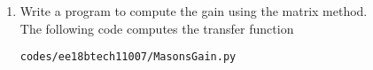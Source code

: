 \begin{enumerate}[label=\thesubsection.\arabic*.,ref=\thesubsection.\theenumi]
\begin{align}
{{\\0&0&-1&1
\\0&0&0&-1/s}}
{
\myvec{1 & 0 & 0 & 1 & 1 \ \\
-1 & 1 & 0 & 0 & 0   \\
 0 & -s-1/s & 1 & 0 & 0 \\
 0 & 0 & -1 & 1 & 0 \\
0 & 0 & 0 & -1/s & 1 }
}
 \label{eq:ee18btech11007_u_gain},
\end{align}
%
using the cofactor expansion and  Problem \ref{prob:ee18btech11007_mat_form}. The gain is obtained as \label{eq:ee18btech11003_gain_sol} after expanding the determinants and simplifying.
%
\item Write a program to compute the gain using the matrix method.
\\
\solution The following code computes the transfer function 
\begin{lstlisting}
codes/ee18btech11007/MasonsGain.py
\end{lstlisting}
\end{enumerate}

